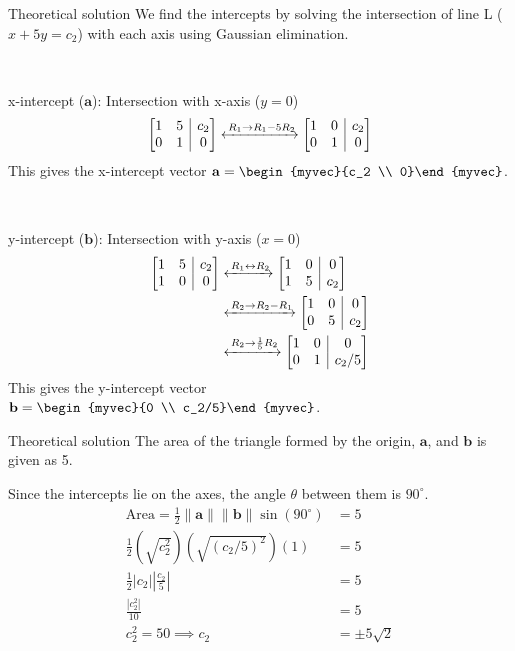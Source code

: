 \documentclass{beamer}
\makeatletter
\numberwithin{equation}{section}
\theoremstyle{remark}
\providecommand{\norm}[1]{\lVert#1\rVert}
\newenvironment{amatrix}[1]{%
	\left[\begin{array}{@{}*{#1}{c}|c@{}}
	}{%
	\end{array}\right]
}
\newcommand{\myaugvec}[2]{\ensuremath{\begin{amatrix}{#1}#2\end{amatrix}}}
\let\vec\mathbf
\makeatother
\begin{document}
	\begin{frame}{Theoretical solution}
		We find the intercepts by solving the intersection of line L ($x+5y=c_2$) with each axis using Gaussian elimination.
		
		\
		
		x-intercept ($\vec{a}$): Intersection with x-axis ($y=0$)
		\begin{align}
			\myaugvec{2}{1 & 5 & c_2 \\ 0 & 1 & 0} \xleftrightarrow{\,R_1 \to R_1 - 5R_2} \myaugvec{2}{1 & 0 & c_2 \\ 0 & 1 & 0}
		\end{align}
		This gives the x-intercept vector $\vec{a} = \begin{myvec}{c_2 \\ 0}\end{myvec}$.
		
		\
		
		y-intercept ($\vec{b}$): Intersection with y-axis ($x=0$)
		\begin{align}
			\myaugvec{2}{1 & 5 & c_2 \\ 1 & 0 & 0} &\xleftrightarrow{\,R_1 \leftrightarrow R_2} \myaugvec{2}{1 & 0 & 0 \\ 1 & 5 & c_2} \\
			&\xleftrightarrow{\,R_2 \to R_2 - R_1} \myaugvec{2}{1 & 0 & 0 \\ 0 & 5 & c_2} \\
			&\xleftrightarrow{\,R_2 \to \frac{1}{5}R_2} \myaugvec{2}{1 & 0 & 0 \\ 0 & 1 & c_2/5}
		\end{align}
		This gives the y-intercept vector $\vec{b} = \begin{myvec}{0 \\ c_2/5}\end{myvec}$.
	\end{frame}
	
	\begin{frame}{Theoretical solution}
		The area of the triangle formed by the origin, $\vec{a}$, and $\vec{b}$ is given as 5.
		
		Since the intercepts lie on the axes, the angle $\theta$ between them is $90^\circ$.
		\begin{align}
			\text{Area} = \frac{1}{2}\norm{\vec{a}}\norm{\vec{b}}\sin(90^\circ) &= 5 \\
			\frac{1}{2} \left(\sqrt{c_2^2}\right) \left(\sqrt{(c_2/5)^2}\right) (1) &= 5 \\
			\frac{1}{2} |c_2| \left|\frac{c_2}{5}\right|
			&= 5 \\
			\frac{|c_2^2|}{10} &= 5 \\
			c_2^2 = 50 \implies c_2 &= \pm 5\sqrt{2}
		\end{align}
	\end{frame}
	
\end{document}
